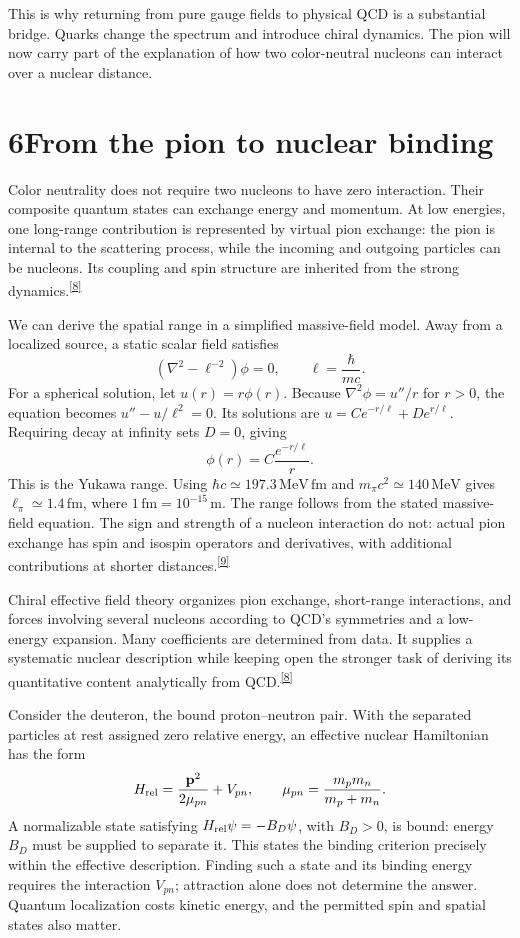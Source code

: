 \documentclass[11pt]{article}
\newcommand{\heading}[2]{\phantomsection\pdfbookmark[1]{#1. #2}{section#1}\section*{#1\quad #2}}
\newcommand{\refn}[1]{\textsuperscript{\hyperlink{src#1}{[#1]}}}
\begin{document}
This is why returning from pure gauge fields to physical QCD is a substantial bridge. Quarks change the spectrum and introduce chiral dynamics. The pion will now carry part of the explanation of how two color-neutral nucleons can interact over a nuclear distance.

\heading{6}{From the pion to nuclear binding}

Color neutrality does not require two nucleons to have zero interaction. Their composite quantum states can exchange energy and momentum. At low energies, one long-range contribution is represented by virtual pion exchange: the pion is internal to the scattering process, while the incoming and outgoing particles can be nucleons. Its coupling and spin structure are inherited from the strong dynamics.\refn{8}

We can derive the spatial range in a simplified massive-field model. Away from a localized source, a static scalar field satisfies
\[
 (\nabla^2-\ell^{-2})\phi=0,\qquad \ell=\frac{\hbar}{mc}.
\]
For a spherical solution, let $u(r)=r\phi(r)$. Because $\nabla^2\phi=u''/r$ for $r>0$, the equation becomes $u''-u/\ell^2=0$. Its solutions are $u=C e^{-r/\ell}+D e^{r/\ell}$. Requiring decay at infinity sets $D=0$, giving
\[
 \phi(r)=C\frac{e^{-r/\ell}}r.
\]
This is the Yukawa range. Using $\hbar c\simeq197.3\,\mathrm{MeV\,fm}$ and $m_\pi c^2\simeq140\,\mathrm{MeV}$ gives $\ell_\pi\simeq1.4\,\mathrm{fm}$, where $1\,\mathrm{fm}=10^{-15}\,\mathrm m$. The range follows from the stated massive-field equation. The sign and strength of a nucleon interaction do not: actual pion exchange has spin and isospin operators and derivatives, with additional contributions at shorter distances.\refn{9}

Chiral effective field theory organizes pion exchange, short-range interactions, and forces involving several nucleons according to QCD's symmetries and a low-energy expansion. Many coefficients are determined from data. It supplies a systematic nuclear description while keeping open the stronger task of deriving its quantitative content analytically from QCD.\refn{8}

Consider the deuteron, the bound proton--neutron pair. With the separated particles at rest assigned zero relative energy, an effective nuclear Hamiltonian has the form
\[
 H_{\rm rel}=\frac{\mathbf p^2}{2\mu_{pn}}+V_{pn},
 \qquad \mu_{pn}=\frac{m_pm_n}{m_p+m_n}.
\]
A normalizable state satisfying $H_{\rm rel}\psi=-B_D\psi$, with $B_D>0$, is bound: energy $B_D$ must be supplied to separate it. This states the binding criterion precisely within the effective description. Finding such a state and its binding energy requires the interaction $V_{pn}$; attraction alone does not determine the answer. Quantum localization costs kinetic energy, and the permitted spin and spatial states also matter.
\end{document}
